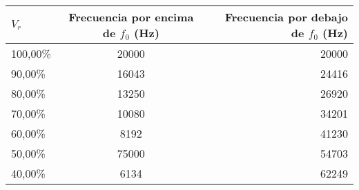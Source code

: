 \begin{tabular}{|l|c|r|}
\hline
$V_{r}$	&Frecuencia por encima de $f_{0}$ (Hz)	&Frecuencia por debajo de $f_{0}$ (Hz)\\ \hline
100,00\%	&20000	&20000\\
90,00\%	& 16043	&24416\\
80,00\%	&13250	&26920\\
70,00\%	&10080	&34201\\
60,00\%	&8192	&41230\\
50,00\%	&75000	&54703\\
40,00\%	&6134	&62249\\ \hline
\end{tabular}

